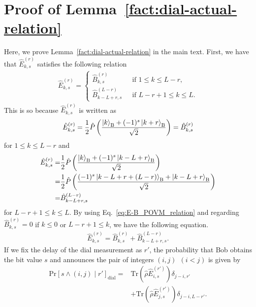 \documentclass[twocolumn,superscriptaddress,pra,footinbib,notitlepage]{revtex4-1}
\newcommand{\tr}[1]{\mathrm{Tr}\left(#1\right)}
\newcommand{\1}{\mbox{1}\hspace{-0.25em}\mbox{l}}
\newcommand{\cpr}[2]{\mathrm{Pr}\left[#1\middle|#2\right]}
\begin{document}

\appendix
\section{Proof of Lemma~\ref{fact:dial-actual-relation}}
\label{append:dial-measurement}
Here, we prove Lemma~\ref{fact:dial-actual-relation} in the main text.
First, we have that $\hat{E}_{k, s}^{(r)}$ satisfies the following relation
\begin{align}
\hat{E}_{k, s}^{(r)}=
\begin{cases}
\hat{B}_{k, s}^{(r)}&~~~\textrm{if }1\leq k\leq L-r,\\
\hat{B}_{k-L+r, s}^{(L-r)}&~~~\textrm{if }L-r+1\leq k\leq L.
\end{cases}
\label{eq:E-B_POVM_relation}
\end{align}
This is so because $\hat{E}_{k, s}^{(r)}$ is written as
\begin{align}
\hat{E}_{k, s}^{(r)}=\frac{1}{2}\hat{P}\left(\frac{\ket{k}_\textrm{B}+(-1)^s\ket{k+r}_\textrm{B}}{\sqrt{2}}\right)=\hat{B}_{k, s}^{(r)}
\end{align}
for $1\leq k\leq L-r$ and 
\begin{align}
\hat{E}_{k, s}^{(r)}=&\frac{1}{2}\hat{P}\left(\frac{\ket{k}_\textrm{B}+(-1)^s\ket{k-L+r}_\textrm{B}}{\sqrt{2}}\right)\nonumber\\
=&\frac{1}{2}\hat{P}\left(\frac{(-1)^s\ket{k-L+r+(L-r)}_\textrm{B}+\ket{k-L+r}_\textrm{B}}{\sqrt{2}}\right)\nonumber\\
=&\hat{B}_{k-L+r, s}^{(L-r)}
\end{align}
for $L-r+1\leq k\leq L$.
By using Eq.~\eqref{eq:E-B_POVM_relation} and regarding $\hat{B}_{k, s}^{(r)}=0$ if $k\leq0$ or $L-r+1\leq k$, we have the following equation.
\begin{align}
\hat{E}_{k, s}^{(r)}=\hat{B}_{k, s}^{(r)}+\hat{B}_{k-L+r, s}^{(L-r)}.\label{eq:e-b_measurement}
\end{align}
If we fix the delay of the dial measurement as $r'$, the probability that Bob obtains the bit value $s$ and announces the pair of integers $(i, j)~~(i<j)$ is given by
\begin{align}
\cpr{s\wedge(i, j)}{r'}_\textrm{dial}=&\tr{\hat{\rho}\hat{E}_{i, s}^{(r')}}\delta_{j-i, r'}\nonumber\\
&+\tr{\hat{\rho}\hat{E}_{j, s}^{(r')}}\delta_{j-i, L-r'}.\label{eq:cpr-dial}
\end{align}
\end{document}
